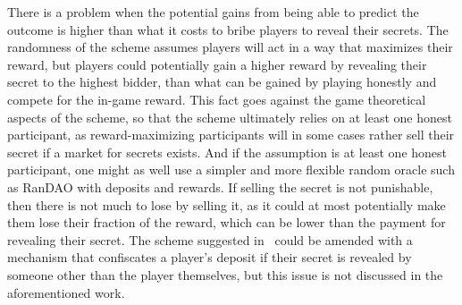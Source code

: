 There is a problem when the potential gains from being able to predict the outcome is higher than what it costs to bribe players to reveal their secrets. The randomness of the scheme assumes players will act in a way that maximizes their reward, but players could potentially gain a higher reward by revealing their secret to the highest bidder, than what can be gained by playing honestly and compete for the in-game reward. This fact goes against the game theoretical aspects of the scheme, so that the scheme ultimately relies on at least one honest participant, as reward-maximizing participants will in some cases rather sell their secret if a market for secrets exists. And if the assumption is at least one honest participant, one might as well use a simpler and more flexible random oracle such as RanDAO with deposits and rewards. If selling the secret is not punishable, then there is not much to lose by selling it, as it could at most potentially make them lose their fraction of the reward, which can be lower than the payment for revealing their secret. The scheme suggested in~\cite{chatterjee_probabilistic_2019} could be amended with a mechanism that confiscates a player's deposit if their secret is revealed by someone other than the player themselves, but this issue is not discussed in the aforementioned work.
